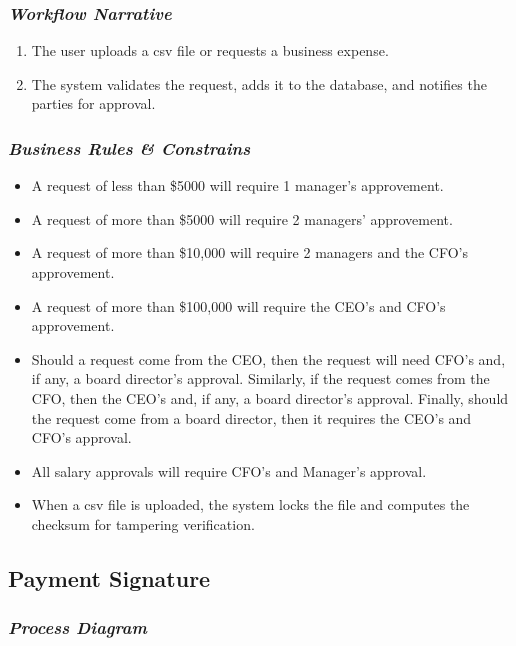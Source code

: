 \documentclass[11pt,a4paper]{article}
\begin{document}
\subsubsection{\textit{Workflow Narrative}}

\begin{enumerate}
\def\labelenumi{\arabic{enumi}.}
\item
  The user uploads a csv file or requests a business expense.
\item
  The system validates the request, adds it to the database, and
  notifies the parties for approval.
\end{enumerate}

\subsubsection{\textit{Business Rules \& Constrains}}

\begin{itemize}
\item
  A request of less than \$5000 will require 1 manager's approvement.
\item
  A request of more than \$5000 will require 2 managers' approvement.
\item
  A request of more than \$10,000 will require 2 managers and the CFO's
  approvement.
\item
  A request of more than \$100,000 will require the CEO's and CFO's
  approvement.
\item
  Should a request come from the CEO, then the request will need CFO's
  and, if any, a board director's approval. Similarly, if the request
  comes from the CFO, then the CEO's and, if any, a board director's
  approval. Finally, should the request come from a board director, then
  it requires the CEO's and CFO's approval.
\item
  All salary approvals will require CFO's and Manager's approval.
\item
  When a csv file is uploaded, the system locks the file and computes
  the checksum for tampering verification.
\end{itemize}

\subsection{Payment Signature}

\subsubsection{\textit{Process Diagram}}
\end{document}
